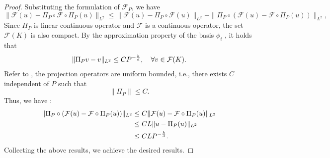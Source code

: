 \documentclass[preprint,12pt]{elsarticle}
\theoremstyle{plain}
\numberwithin{figure}{section}
\numberwithin{table}{section}
\begin{document}
\begin{proof}
	
	Substituting the formulation of $\mathcal{F}_P$, we have
	$$
	\|\mathcal{F}(u)-\Pi_P \circ \mathcal{F} \circ \Pi_P(u)\|_{L^2}\le \|\mathcal{F}(u)-\Pi_P\circ \mathcal{F}(u)\|_{L^2} + \|\Pi_P\circ( \mathcal{F}(u)-\mathcal{F}\circ \Pi_P (u))\|_{L^2},
	$$
	Since $\Pi_P$ is  linear continuous operator and $\mathcal{F}$ is a continuous operator, the set $\mathcal{F}(K)$  is also compact. By the approximation property of the basis $\phi_i$ , it holds that
	$$
	\|\Pi_P v-v\|_{L^2} \le CP^{-{k\over d}}, \quad \forall v\in \mathcal{F}(K).
	$$
	Refer to \cite[Theorem 4.10]{fabian2011banach}, the projection operators are uniform bounded, i.e., there exists $C$ independent of $P$ such that
	$$
	\|\Pi_P\|\le C.
	$$
	Thus, we have :
	$$
	\begin{aligned}
		\|\Pi_P\circ( \mathcal{F}(u)-\mathcal{F}\circ \Pi_P(u))\|_{L^2} &\le C\|\mathcal{F}(u)-\mathcal{F}\circ \Pi_P (u)\|_{L^2}\\
		&\le CL\|u-\Pi_P (u)\|_{L^2}\\
		&\le CLP^{-{k\over d}}.
	\end{aligned}
	$$
	Collecting the above results, we achieve the desired results.
\end{proof}
\end{document}
